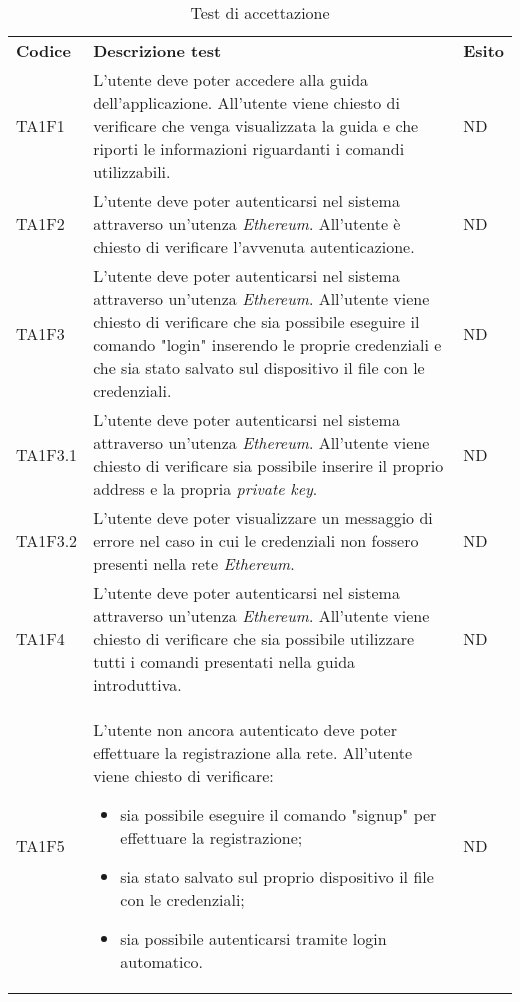 \setlength{\tabcolsep}{0.5em}
\renewcommand{\arraystretch}{1.5}
\begin{longtable}{|C{1.5cm}|C{10cm}|C{1.5cm}|}

	\caption{Test di accettazione }\\
	\hline

	\textbf{Codice} & \textbf{Descrizione test}  & \textbf{Esito}
	\tabularnewline
	\endfirsthead

	TA1F1 &
	L’utente deve poter accedere alla guida dell’applicazione. All’utente viene chiesto di veriﬁcare che venga visualizzata la guida e che riporti le informazioni riguardanti i comandi utilizzabili.  &
	ND \\

	TA1F2  &
	L’utente deve poter autenticarsi nel sistema attraverso un'utenza \textit{Ethereum\glos}.
	All’utente è chiesto di veriﬁcare l’avvenuta autenticazione. &
	ND \\

	TA1F3 &
	L’utente deve poter autenticarsi nel sistema attraverso un'utenza \textit{Ethereum\glos}. All’utente viene chiesto di verificare che sia possibile eseguire il comando "login" inserendo le proprie credenziali e che sia stato salvato sul dispositivo il file con le credenziali. &
	ND \\

	TA1F3.1 &
	L’utente deve poter autenticarsi nel sistema attraverso un'utenza \textit{Ethereum\glos}. All’utente viene chiesto di verificare sia possibile inserire il proprio address e la propria \textit{private key\glos}. &
	ND \\

	TA1F3.2 &
	L’utente deve poter visualizzare un messaggio di errore nel caso in cui le credenziali non fossero	presenti nella rete \textit{Ethereum\glo}. &
	ND \\

	TA1F4 &
	L’utente deve poter autenticarsi nel sistema attraverso un'utenza \textit{Ethereum}. All’utente viene chiesto di verificare che sia possibile utilizzare tutti i comandi presentati nella guida introduttiva. &
	ND \\

	TA1F5 &
	L’utente non ancora autenticato deve poter effettuare la registrazione alla rete. All’utente viene chiesto di verificare:
	\begin{itemize}
		\item sia possibile eseguire il comando "signup" per effettuare la registrazione;
		\item sia stato salvato sul proprio dispositivo il file con le credenziali;
		\item sia possibile autenticarsi tramite login automatico.
	\end{itemize} &
	ND \\ [-5ex]


\end{longtable}
